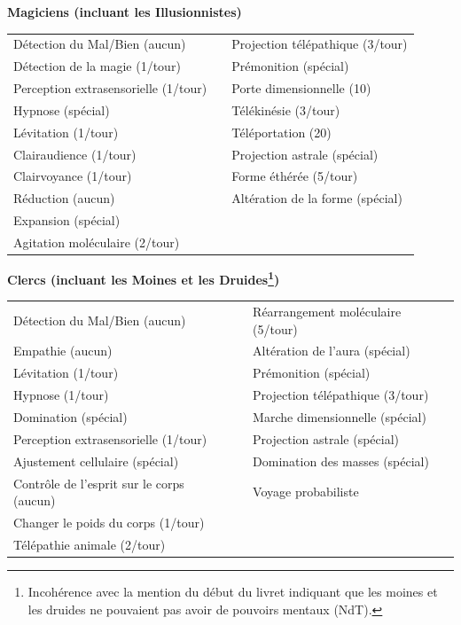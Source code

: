 \documentclass[11pt]{article}
\begin{document}
{\bigskip

\textbf{Magiciens (incluant les Illusionnistes)}

\bigskip

\begin{tabular}{p{7.5cm}p{0.3cm}p{7.5cm}}
Détection du Mal/Bien (aucun) && Projection télépathique (3/tour) \\
Détection de la magie (1/tour) && Prémonition (spécial) \\
Perception extrasensorielle (1/tour) && Porte dimensionnelle (10) \\
Hypnose (spécial) && Télékinésie (3/tour) \\
Lévitation (1/tour) && Téléportation (20) \\
Clairaudience (1/tour) && Projection astrale (spécial) \\
Clairvoyance (1/tour) && Forme éthérée (5/tour) \\
Réduction (aucun) && Altération de la forme (spécial) \\
Expansion (spécial) && \\
Agitation moléculaire (2/tour) && \\
\end{tabular}

\bigskip

\textbf{Clercs (incluant les Moines et les Druides\footnote{Incohérence avec la mention du début du livret indiquant que les moines et les druides ne pouvaient pas avoir de pouvoirs mentaux (NdT).})}

\bigskip

\begin{tabular}{p{7.5cm}p{0.3cm}p{7.5cm}}
Détection du Mal/Bien (aucun) && Réarrangement moléculaire (5/tour) \\
Empathie (aucun) && Altération de l'aura (spécial) \\
Lévitation (1/tour) && Prémonition (spécial) \\
Hypnose (1/tour) && Projection télépathique (3/tour) \\
Domination (spécial) && Marche dimensionnelle (spécial) \\
Perception extrasensorielle (1/tour) && Projection astrale (spécial) \\
Ajustement cellulaire (spécial) && Domination des masses (spécial) \\
Contrôle de l'esprit sur le corps (aucun) &&  Voyage probabiliste \\
Changer le poids du corps (1/tour) && \\
Télépathie animale (2/tour) && \\
\end{tabular}

}
\end{document}
